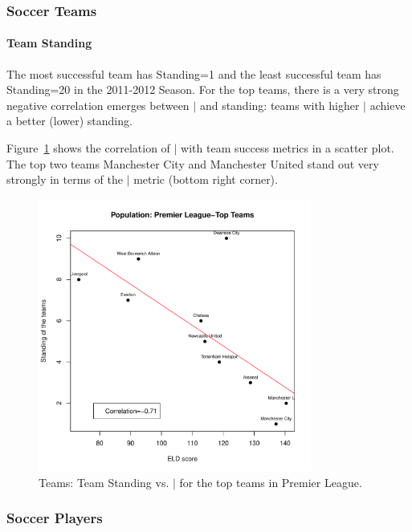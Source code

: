 {	
	

			
\subsubsection{Soccer Teams} 
\paragraph{Team Standing}
	The most successful team has Standing=1 and the least successful team has Standing=20 in the 2011-2012 Season. For the top teams, there is a very strong negative correlation emerges between $\mid$ and standing: teams with higher $\mid$ achieve a better (lower) standing. 
	
	Figure~\ref{fig:TeamStandingELD} shows the correlation of $\mid$ with team success metrics in a scatter plot. The top two teams Manchester City and Manchester United stand out very strongly in terms of the $\mid$ metric (bottom right corner).

\begin{figure}[t]
	\centering
	\includegraphics[width=0.8\textwidth]{topTeamStats-Sep.pdf}
	
	\caption{Teams: Team Standing vs. $\mid$ for the top teams in Premier League. 
		\label{fig:TeamStandingELD}}
\end{figure}

\subsubsection{Soccer Players}

}
